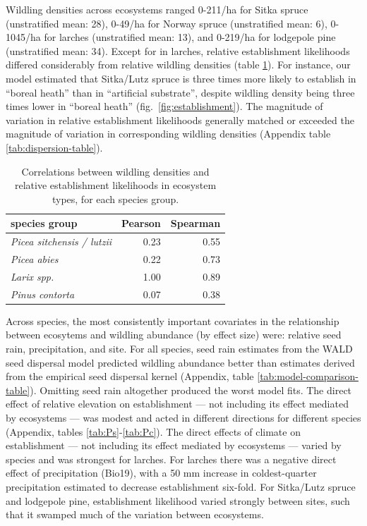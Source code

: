 \documentclass[
]{article}
\begin{document}
Wildling densities across ecosystems ranged 0-211/ha for Sitka spruce (unstratified mean: 28), 0-49/ha for Norway spruce (unstratified mean: 6), 0-1045/ha for larches (unstratified mean: 13), and 0-219/ha for lodgepole pine (unstratified mean: 34).
Except for in larches, relative establishment likelihoods differed considerably from relative wildling densities (table \ref{tab:estimate-correlation-table}).
For instance, our model estimated that Sitka/Lutz spruce is three times more likely to establish in ``boreal heath'' than in ``artificial substrate'', despite wildling density being three times lower in ``boreal heath'' (fig.~\ref{fig:establishment}).
The magnitude of variation in relative establishment likelihoods generally matched or exceeded the magnitude of variation in corresponding wildling densities (Appendix table \ref{tab:dispersion-table}).

\begin{table}

\caption{\label{tab:estimate-correlation-table}Correlations between wildling densities and relative establishment likelihoods in ecosystem types, for each species group.}
\centering
\begin{tabular}[t]{>{}lrr}
\toprule
species group & Pearson & Spearman\\
\midrule
\em{Picea sitchensis / lutzii} & 0.23 & 0.55\\
\em{Picea abies} & 0.22 & 0.73\\
\em{Larix spp.} & 1.00 & 0.89\\
\em{Pinus contorta} & 0.07 & 0.38\\
\bottomrule
\end{tabular}
\end{table}

Across species, the most consistently important covariates in the relationship between ecosytems and wildling abundance (by effect size) were: relative seed rain, precipitation, and site.
For all species, seed rain estimates from the WALD seed dispersal model predicted wildling abundance better than estimates derived from the empirical seed dispersal kernel (Appendix, table \ref{tab:model-comparison-table}).
Omitting seed rain altogether produced the worst model fits.
The direct effect of relative elevation on establishment --- not including its effect mediated by ecosystems --- was modest and acted in different directions for different species (Appendix, tables \ref{tab:Ps}-\ref{tab:Pc}).
The direct effects of climate on establishment --- not including its effect mediated by ecosystems --- varied by species and was strongest for larches.
For larches there was a negative direct effect of precipitation (Bio19), with a 50 mm increase in coldest-quarter precipitation estimated to decrease establishment six-fold.
For Sitka/Lutz spruce and lodgepole pine, establishment likelihood varied strongly between sites, such that it swamped much of the variation between ecosystems.
\end{document}
